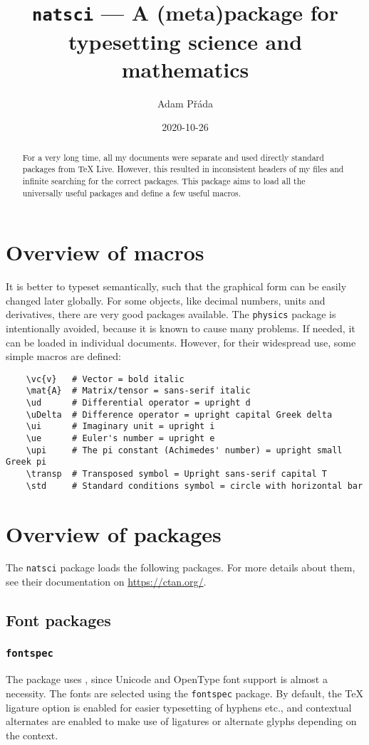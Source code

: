 \documentclass{article}
\title{\texttt{natsci} --- A (meta)package for typesetting science and mathematics}
\author{Adam Přáda}
\date{2020-10-26}
\begin{document}
\maketitle
\begin{abstract}
    \noindent
    For a very long time, all my documents were separate and used directly standard packages from \TeX{} Live. However, this resulted in inconsistent headers of my files and infinite searching for the correct packages. This package aims to load all the universally useful packages and define a few useful macros.
\end{abstract}
\section{Overview of macros}
It is better to typeset semantically, such that the graphical form can be easily changed later globally. For some objects, like decimal numbers, units and derivatives, there are very good packages available. The \texttt{physics} package is intentionally avoided, because it is known to cause many problems. If needed, it can be loaded in individual documents. However, for their widespread use, some simple macros are defined:
\begin{verbatim}
    \vc{v}   # Vector = bold italic
    \mat{A}  # Matrix/tensor = sans-serif italic
    \ud      # Differential operator = upright d
    \uDelta  # Difference operator = upright capital Greek delta
    \ui      # Imaginary unit = upright i
    \ue      # Euler's number = upright e
    \upi     # The pi constant (Achimedes' number) = upright small Greek pi
    \transp  # Transposed symbol = Upright sans-serif capital T
    \std     # Standard conditions symbol = circle with horizontal bar
\end{verbatim}
\newpage
\section{Overview of packages}
The \texttt{natsci} package loads the following packages. For more details about them, see their documentation on \url{https://ctan.org/}.
\subsection{Font packages}
\subsubsection{\texttt{fontspec}}
The package uses , since Unicode and OpenType font support is almost a necessity. The fonts are selected using the \texttt{fontspec} package. By default, the \TeX{} ligature option is enabled for easier typesetting of hyphens etc., and contextual alternates are enabled to make use of ligatures or alternate glyphs depending on the context.
\end{document}
